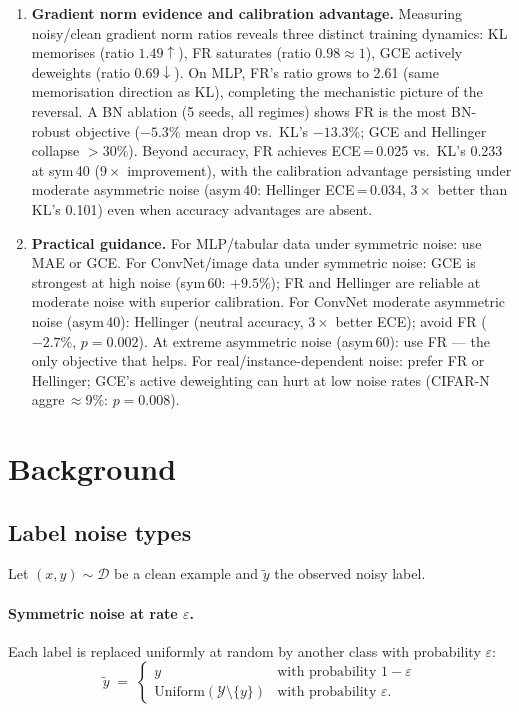 \documentclass[11pt]{article}
\begin{document}
\begin{enumerate}
  \item \textbf{Gradient norm evidence and calibration advantage.}
    Measuring noisy/clean gradient norm ratios reveals three distinct training
    dynamics: KL memorises (ratio $1.49\uparrow$), FR saturates (ratio $0.98
    \approx 1$), GCE actively deweights (ratio $0.69\downarrow$).
    On MLP, FR's ratio grows to 2.61 (same memorisation direction as KL),
    completing the mechanistic picture of the reversal.
    A BN ablation (5 seeds, all regimes) shows FR is the most BN-robust objective
    ($-5.3\%$ mean drop vs.\ KL's $-13.3\%$; GCE and Hellinger collapse $>30\%$).
    Beyond accuracy, FR achieves ECE\,=\,0.025 vs.\ KL's 0.233 at sym\,40
    ($9\times$ improvement), with the calibration advantage persisting under moderate
    asymmetric noise (asym\,40: Hellinger ECE\,=\,0.034, $3\times$ better than KL's
    0.101) even when accuracy advantages are absent.

  \item \textbf{Practical guidance.}
    For MLP/tabular data under symmetric noise: use MAE or GCE.
    For ConvNet/image data under symmetric noise: GCE is strongest at high noise
    (sym\,60: $+9.5\%$); FR and Hellinger are reliable at moderate noise with
    superior calibration.
    For ConvNet moderate asymmetric noise (asym\,40): Hellinger (neutral accuracy,
    $3\times$ better ECE); avoid FR ($-2.7\%$, $p=0.002$).
    At extreme asymmetric noise (asym\,60): use FR — the only objective that helps.
    For real/instance-dependent noise: prefer FR or Hellinger; GCE's active
    deweighting can hurt at low noise rates (CIFAR-N aggre\,$\approx$9\%: $p=0.008$).
\end{enumerate}

\section{Background}

\subsection{Label noise types}

Let $(x, y) \sim \mathcal{D}$ be a clean example and $\tilde{y}$ the observed
noisy label.

\paragraph{Symmetric noise at rate $\varepsilon$.}
Each label is replaced uniformly at random by another class with probability
$\varepsilon$:
\[
  \tilde{y} \;=\;
  \begin{cases}
    y & \text{with probability } 1-\varepsilon \\
    \mathrm{Uniform}(\mathcal{Y} \setminus \{y\}) & \text{with probability } \varepsilon.
  \end{cases}
\]
\end{document}
